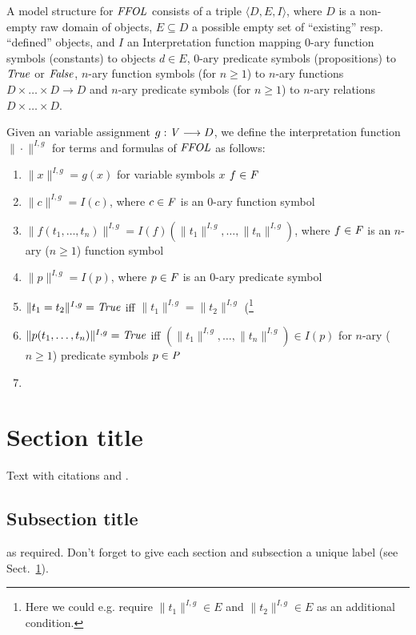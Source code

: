 \begin{definition}
  A model structure for $\FFOL$ consists of a triple
  $\langle D, E, I\rangle$, where $D$ is a non-empty raw domain of
  objects, $E\subseteq D$ a possible empty set of ``existing''
  resp. ``defined'' objects, and $I$ an Interpretation function
  mapping 0-ary function symbols (constants) to objects $d\in E$, 
 0-ary predicate symbols (propositions) to $\True$ or $\False$, 
  $n$-ary function symbols (for $n\geq 1$) to $n$-ary functions
  $D \times \ldots \times D \longrightarrow D$ and $n$-ary predicate
  symbols (for $n\geq 1$) to $n$-ary relations
  $D \times \ldots \times D$.

  Given an variable assignment $g: \V \longrightarrow D$, we
  define the interpretation function $\|\cdot\|^{I,g}$ for terms and formulas of
  $\FFOL$ as follows:
\begin{enumerate}
\item $\| x \|^{I,g} = g(x)$ for variable symbols $x$
  $f\in\F$
\item $\| c \|^{I,g} = I(c)$, where $c\in\F$ is an 0-ary function
  symbol
\item $\| f(t_1,\ldots,t_n)\|^{I,g} = I(f)(\| t_1 \|^{I,g},\ldots,\|
  t_n \|^{I,g})$, where $f\in\F$ is an $n$-ary ($n\geq 1$) function symbol
\item $\| p \|^{I,g} = I(p)$, where $p\in\F$ is an 0-ary predicate
  symbol
\item $\| t_1 = t_2 \|^{I,g} = \True$ iff $\| t_1 \|^{I,g} = \| t_2
  \|^{I,g}$ (\footnote{Here we could e.g. require $\| t_1 \|^{I,g} \in E$ and
  $\| t_2 \|^{I,g} \in E$ as an additional condition.}
\item $\| p(t_1,\ldots,t_n) \|^{I,g} = \True$ iff $(\| t_1 \|^{I,g},\ldots,\|
  t_n \|^{I,g}) \in I(p)$ for $n$-ary ($n\geq 1$) predicate symbols
  $p\in\P$
\item 
\end{enumerate}
\end{definition}
 

\pagebreak
\newpage

\section{Section title}
\label{sec:1}
Text with citations \cite{RefB} and \cite{RefJ}.
\subsection{Subsection title}
\label{sec:2}
as required. Don't forget to give each section
and subsection a unique label (see Sect.~\ref{sec:1}).
